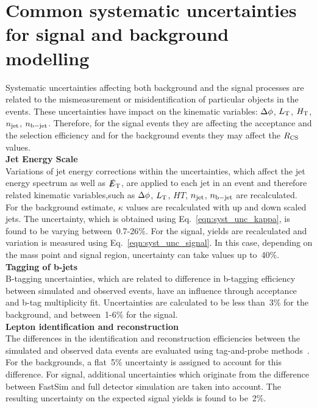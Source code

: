\section{Common systematic uncertainties for signal and background modelling}
Systematic uncertainties affecting both background and the signal processes are related to the mismeasurement or misidentification of particular objects in the events. These uncertainties have impact on the kinematic variables: $\Delta \phi$, $L_{\rm T}$, $H_{\rm T}$, $n_{\rm jet}$, $n_{\rm b-jet}$. Therefore, for the signal events they are affecting the acceptance and the selection efficiency and for the background events they may affect the $R_{\rm CS}$ values.\\
\textbf{Jet Energy Scale}\\
Variations of jet energy corrections within the uncertainties, which affect the jet energy spectrum as well as $\slashed{E}_{\rm T}$, are applied to each jet in an event and therefore related kinematic variables,such as $\Delta \phi$, $L_{\rm T}$, $HT$, $n_{\rm jet}$, $n_{\rm b-jet}$ are recalculated.\\
For the background estimate, $\kappa$ values are recalculated with up and down scaled jets. The uncertainty, which is obtained using Eq.~\ref{eqn:syst_unc_kappa}, is found to be varying between~0.7-26\%. For the signal, yields are recalculated and variation is measured using Eq.~\ref{eqn:syst_unc_signal}. In this case, depending on the mass point and signal region, uncertainty can take values up to~40\%.\\
\textbf{Tagging of b-jets}\\
B-tagging uncertainties, which are related to difference in b-tagging efficiency between simulated and observed events, have an influence through acceptance and b-tag multiplicity fit. Uncertainties are calculated to be less than~3\% for the background, and between~1-6\% for the signal.\\
\textbf{Lepton identification and reconstruction}\\
The differences in the identification and reconstruction efficiencies between the simulated and observed data events are evaluated using tag-and-probe methods~\cite{ELEID}. For the backgrounds, a flat~5\% uncertainty is assigned to account for this difference. For signal, additional uncertainties which originate from the difference between FastSim and full detector simulation are taken into account. The resulting uncertainty on the expected signal yields is found to be~2\%. \\
